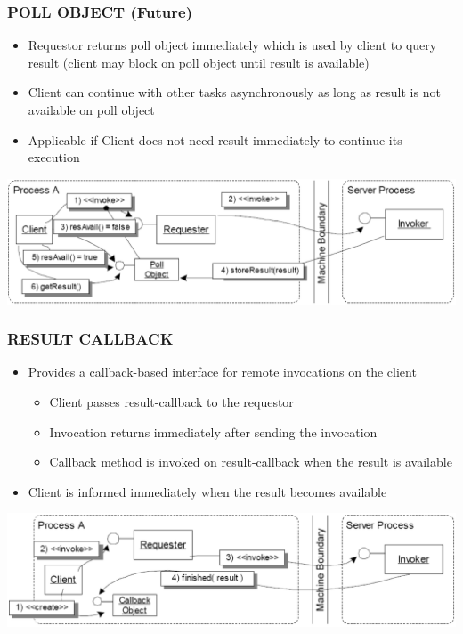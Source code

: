 \documentclass[10pt]{article}
\begin{document}
\subsubsection{POLL OBJECT (Future)}
\begin{itemize}
	\item Requestor returns poll object immediately which is used by client to query result (client may block on poll object until result is available)
	\item Client can continue with other tasks asynchronously as long as result is not available on poll object
	\item Applicable if Client does not need result immediately to continue its execution
\end{itemize}
\begin{center}
	\includegraphics[scale=0.2]{poll-object.png}
\end{center}
\subsubsection{RESULT CALLBACK}
\begin{itemize}
	\item Provides a callback-based interface for remote invocations on the client
		\begin{itemize}
			\item Client passes result-callback to the requestor
			\item Invocation returns immediately after sending the invocation
			\item Callback method is invoked on result-callback when the result is available
		\end{itemize}
	\item Client is informed immediately when the result becomes available
\end{itemize}
\begin{center}
	\includegraphics[scale=0.2]{result-callback.png}
\end{center}
\end{document}
